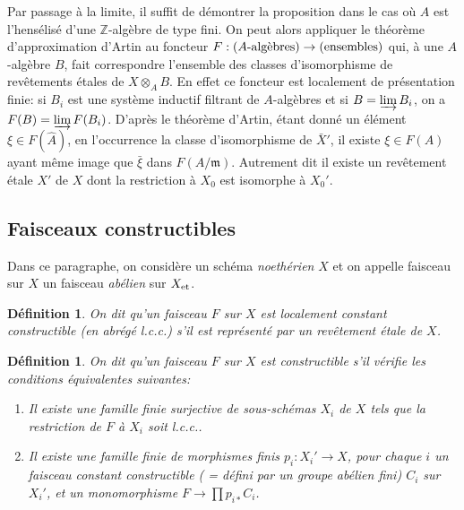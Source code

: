 \documentclass{article}
\newcommand{\et}[1]{{#1}_{\textnormal{et}}}
\newcommand{\dZ}{\mathbb{Z}}
\newcommand{\fm}{\mathfrak{m}}
\newtheorem{definition}[subsubsection]{Définition}
\begin{document}
Par passage à la limite, il suffit de démontrer la proposition dans le cas 
où $A$ est l'hensélisé d'une $\dZ$-algèbre de type fini. On peut alors 
appliquer le théorème d'approximation d'Artin au foncteur 
$F:(\textnormal{$A$-algèbres}) \to (\textnormal{ensembles})$ qui, à une 
$A$-algèbre $B$, fait correspondre l'ensemble des classes d'isomorphisme de 
revêtements étales de $X\otimes_A B$. En effet ce foncteur est localement de 
présentation finie: si $B_i$ est une système inductif filtrant de 
$A$-algèbres et si $B=\varinjlim B_i$, on a $F(B) = \varinjlim F(B_i)$. 
D'après le théorème d'Artin, étant donné un élément 
$\xi\in F(\hat A)$, en l'occurrence la classe d'isomorphisme de $\bar X'$, il 
existe $\xi\in F(A)$ ayant même image que $\bar\xi$ dans $F(A/\fm)$. 
Autrement dit il existe un revêtement étale $X'$ de $X$ dont la restriction 
à $X_0$ est isomorphe à $X_0'$. 










\subsection{Faisceaux constructibles}\label{4-3}

Dans ce paragraphe, on considère un schéma \emph{noethérien} $X$ et on 
appelle faisceau sur $X$ un faisceau \emph{abélien} sur $\et X$. 





\begin{definition}\label{4-3-1}
On dit qu'un faisceau $F$ sur $X$ est \emph{localement constant constructible} 
(en abrégé l.c.c.) s'il est représenté par un revêtement étale de 
$X$. 
\end{definition}





\begin{definition}\label{4-3-2}
On dit qu'un faisceau $F$ sur $X$ est \emph{constructible} s'il vérifie les 
conditions équivalentes suivantes:
\begin{enumerate}[\indent (i)]
  \item Il existe une famille finie surjective de sous-schémas $X_i$ de $X$ 
     tels que la restriction de $F$ à $X_i$ soit l.c.c..
  \item Il existe une famille finie de morphismes finis $p_i:X_i'\to X$, pour 
    chaque $i$ un faisceau constant constructible ( = défini par un groupe 
    abélien fini) $C_i$ sur $X_i'$, et un monomorphisme 
    $F\to \prod p_{i*} C_i$. 
\end{enumerate}
\end{definition}
\end{document}
